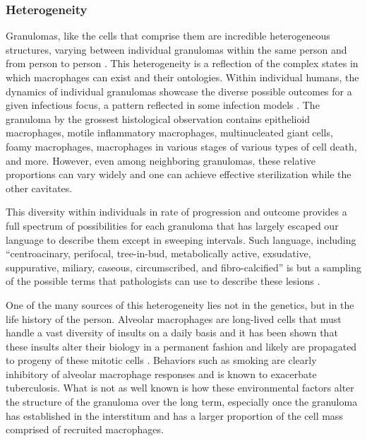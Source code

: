 \subsubsection{Heterogeneity}

Granulomas, like the cells that comprise them are incredible heterogeneous structures, varying between individual granulomas within the same person and from person to person \citep{Matty2015, Lenaerts2015}. This heterogeneity is a reflection of the complex states in which macrophages can exist and their ontologies. Within individual humans, the dynamics of individual granulomas showcase the diverse possible outcomes for a given infectious focus, a pattern reflected in some infection models \citep{Lenaerts2015, Lin2014}. The granuloma by the grossest histological observation contains epithelioid macrophages, motile inflammatory macrophages, multinucleated giant cells, foamy macrophages, macrophages in various stages of various types of cell death, and more. However, even among neighboring granulomas, these relative proportions can vary widely and one can achieve effective sterilization while the other cavitates. 

This diversity within individuals in rate of progression and outcome provides a full spectrum of possibilities for each granuloma that has largely escaped our language to describe them except in sweeping intervals. Such language, including ``centroacinary, perifocal, tree\hyp{}in\hyp{}bud, metabolically active, exsudative, suppurative, miliary, caseous, circumscribed, and fibro\hyp{}calcified'' is but a sampling of the possible terms that pathologists can use to describe these lesions \citep{Ehlers2012}.

One of the many sources of this heterogeneity lies not in the genetics, but in the life history of the person. Alveolar macrophages are long\hyp{}lived cells that must handle a vast diversity of insults on a daily basis and it has been shown that these insults alter their biology in a permanent fashion and likely are propagated to progeny of these mitotic cells \citep{Gonzalez2017, Duan2017, Berg2016, Glickman2016, Woodruff2005, Hodge2007}. Behaviors such as smoking are clearly inhibitory of alveolar macrophage responses and is known to exacerbate tuberculosis. What is not as well known is how these environmental factors alter the structure of the granuloma over the long term, especially once the granuloma has established in the interstitum and has a larger proportion of the cell mass comprised of recruited macrophages.

